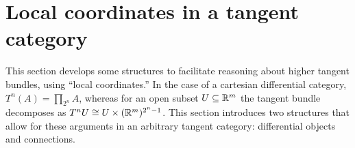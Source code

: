 %


\section{Local coordinates in a tangent category}%
\label{sec:diff-and-tang-struct}

This section develops some structures to facilitate reasoning about higher tangent bundles, using ``local coordinates.'' In the case of a cartesian differential category,  $T^n(A) = \prod_{2^n} A$, whereas for an open subset $U \subseteq \mathbb{R}^m$ the tangent bundle decomposes as $T^nU \cong U \times (\mathbb{R}^m)^{2^n - 1}$. This section introduces two structures that allow for these arguments in an arbitrary tangent category: differential objects and connections.

